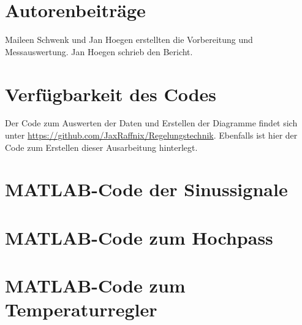 \documentclass[
    paper=a4,
    fontsize=10pt,
    DIV=12,
    oneside,
]{scrartcl}
\begin{document}

\printbibliography[heading=bibnumbered]

\section{Autorenbeiträge}
    Maileen Schwenk und Jan Hoegen erstellten die Vorbereitung und Messauswertung. Jan Hoegen schrieb den Bericht.

\section{Verfügbarkeit des Codes}
    Der Code zum Auswerten der Daten und Erstellen der Diagramme findet sich unter \url{https://github.com/JaxRaffnix/Regelungstechnik}. Ebenfalls ist hier der Code zum Erstellen dieser Ausarbeitung hinterlegt.


\appendix

\section{MATLAB-Code der Sinussignale}
    

\section{MATLAB-Code zum Hochpass}
    

\section{MATLAB-Code zum Temperaturregler}
    
\end{document}

